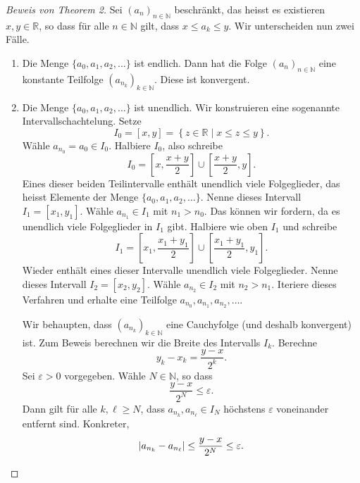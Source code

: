 \documentclass[../main.tex]{subfiles}
\begin{document}
\begin{proof}[Beweis von Theorem 2]
  Sei ${(a_n)}_{n \in \mathbb{N}}$ beschränkt, das heisst
  es existieren $x, y \in \mathbb{R}$, so dass für
  alle $n \in \mathbb{N}$ gilt, dass $x \leq a_k \leq y$.
  Wir unterscheiden nun zwei Fälle.
  \begin{enumerate}[1.]
    \item Die Menge $\{a_0, a_1, a_2, \dots\}$ ist endlich.
      Dann hat die Folge ${(a_n)}_{n \in \mathbb{N}}$ 
      eine konstante Teilfolge
      ${(a_{n_k})}_{k \in \mathbb{N}}$.
      Diese ist konvergent.
    \item Die Menge $\{a_0, a_1, a_2, \dots\}$ ist unendlich.
      Wir konstruieren eine sogenannte Intervallschachtelung.
      Setze 
      \[
        I_0 = [x, y] = \left\{z \in \mathbb{R} 
        \mid x \leq z \leq y\right\}.
      \]
      Wähle $a_{n_0} = a_0 \in I_0$. Halbiere $I_0$, also
      schreibe
      \[
        I_0 = \left[ x, \frac{x+y}{2} \right] 
        \cup \left[ \frac{x+y}{2}, y \right].
      \]
      Eines dieser beiden Teilintervalle enthält
      unendlich viele Folgeglieder,
      das heisst Elemente der Menge
      $\{a_0, a_1, a_2, \dots\}$. Nenne dieses Intervall
      $I_1 = [x_1, y_1]$. Wähle $a_{n_1} \in I_1$
      mit $n_1 > n_0$. Das können wir fordern,
      da es unendlich viele Folgeglieder in 
      $I_1$ gibt.
      Halbiere wie oben $I_1$ und schreibe
      \[
        I_1 = \left[ x_1, \frac{x_1 + y_1}{2} \right] 
        \cup \left[ \frac{x_1 + y_1}{2}, y_1 \right].
      \]
      Wieder enthält eines dieser Intervalle
      unendlich viele Folgeglieder. Nenne dieses
      Intervall $I_2 = [x_2, y_2]$. Wähle
      $a_{n_2} \in I_2$ mit $n_{2} > n_1$.
      Iteriere dieses Verfahren und erhalte eine
      Teilfolge $a_{n_0}, a_{n_1}, a_{n_2}, \dots$.

      Wir behaupten, dass ${(a_{n_k})}_{k \in \mathbb{N}}$
      eine Cauchyfolge (und deshalb konvergent) ist.
      Zum Beweis berechnen wir die Breite des
      Intervalls $I_k$. Berechne
      \[
        y_k - x_k = \frac{y - x}{2^k}.
      \]
      Sei $\varepsilon > 0$ vorgegeben. Wähle
      $N \in \mathbb{N}$, so dass
      \[
        \frac{y-x}{2^N} \leq \varepsilon.
      \]
      Dann gilt für alle $k, \ell \geq N$, dass
      $a_{n_k}, a_{n_\ell} \in I_N$ höchstens
      $\varepsilon$ voneinander entfernt sind.
      Konkreter,
      \[
        |a_{n_k} - a_{n_\ell}| 
        \leq \frac{y-x}{2^N} \leq \varepsilon. \qedhere
      \]
  \end{enumerate}
\end{proof}
\end{document}
